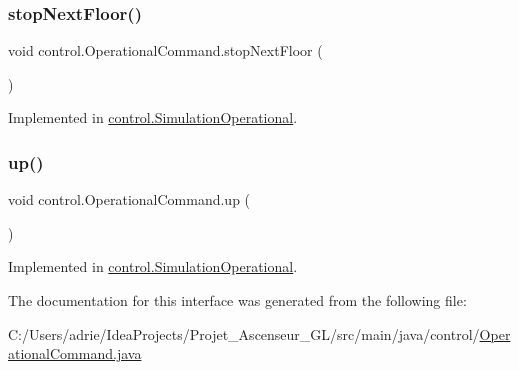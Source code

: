 \subsubsection{\texorpdfstring{stopNextFloor()}{stopNextFloor()}}
{\footnotesize\ttfamily void control.\+Operational\+Command.\+stop\+Next\+Floor (\begin{DoxyParamCaption}{ }\end{DoxyParamCaption})}



Implemented in \mbox{\hyperlink{classcontrol_1_1_simulation_operational_a2ca8414424f8becf5c5942b9dbba80aa}{control.\+Simulation\+Operational}}.

\mbox{\label{interfacecontrol_1_1_operational_command_a23231ea40f8bf5cd07b864238f258b5f}} 
\subsubsection{\texorpdfstring{up()}{up()}}
{\footnotesize\ttfamily void control.\+Operational\+Command.\+up (\begin{DoxyParamCaption}{ }\end{DoxyParamCaption})}



Implemented in \mbox{\hyperlink{classcontrol_1_1_simulation_operational_ab3ade4511703ee9715f82ce6e9a036a0}{control.\+Simulation\+Operational}}.



The documentation for this interface was generated from the following file\+:\begin{DoxyCompactItemize}
\item 
C\+:/\+Users/adrie/\+Idea\+Projects/\+Projet\+\_\+\+Ascenseur\+\_\+\+G\+L/src/main/java/control/\mbox{\hyperlink{_operational_command_8java}{Operational\+Command.\+java}}\end{DoxyCompactItemize}
